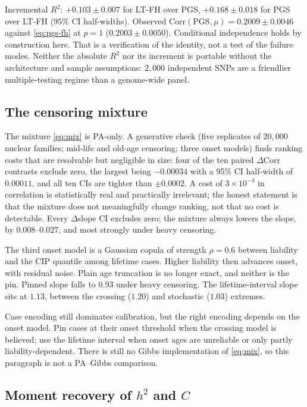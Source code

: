 \documentclass[11pt,a4paper]{article}
\newcommand{\Corr}{\mathrm{Corr}}
\newcommand{\h}{h^{2}}
\begin{document}
Incremental $R^{2}$: $+0.103\pm 0.007$ for LT-FH over PGS,
$+0.168\pm 0.018$ for PGS over LT-FH
($95\%$ CI half-widths).
Observed $\Corr(\mathrm{PGS},\mu)=0.2009\pm 0.0046$ against
\eqref{eq:pgs-fh} at $p=1$ ($0.2003\pm 0.0050$).
Conditional independence holds by construction here.
That is a verification of the identity, not a test of the
failure modes.
Neither the absolute $R^{2}$ nor its increment is portable without the
architecture and sample assumptions: $2{,}000$ independent SNPs are a
friendlier multiple-testing regime than a genome-wide panel.

\subsection{The censoring mixture}

The mixture \eqref{eq:mix} is PA-only.
A generative check (five replicates of $20{,}000$ nuclear
families; mid-life and old-age censoring; three onset models)
finds ranking costs that are resolvable but negligible in size:
four of the ten paired $\Delta\Corr$ contrasts exclude zero, the
largest being $-0.00034$ with a 95\% CI half-width of $0.00011$, and all ten CIs are tighter
than $\pm 0.0002$.
A cost of $3\times 10^{-4}$ in correlation is statistically real
and practically irrelevant; the honest statement is that the
mixture does not meaningfully change ranking, not that no cost is
detectable.
Every $\Delta$slope CI excludes zero; the mixture always lowers
the slope, by $0.008$--$0.027$, and most strongly under heavy
censoring.

The third onset model is a Gaussian copula of strength
$\rho=0.6$ between liability and the CIP quantile among lifetime
cases.
Higher liability then advances onset, with residual noise.
Plain age truncation is no longer exact, and neither is the pin.
Pinned slope falls to $0.93$ under heavy censoring.
The lifetime-interval slope sits at $1.13$, between the crossing
($1.20$) and stochastic ($1.03$) extremes.

Case encoding still dominates calibration, but the right encoding
depends on the onset model.
Pin cases at their onset threshold when the crossing model is
believed; use the lifetime interval when onset ages are unreliable
or only partly liability-dependent.
There is still no Gibbs implementation of \eqref{eq:mix}, so this
paragraph is not a PA--Gibbs comparison.

\subsection{Moment recovery of \(\h\) and \(C\)}
\end{document}
